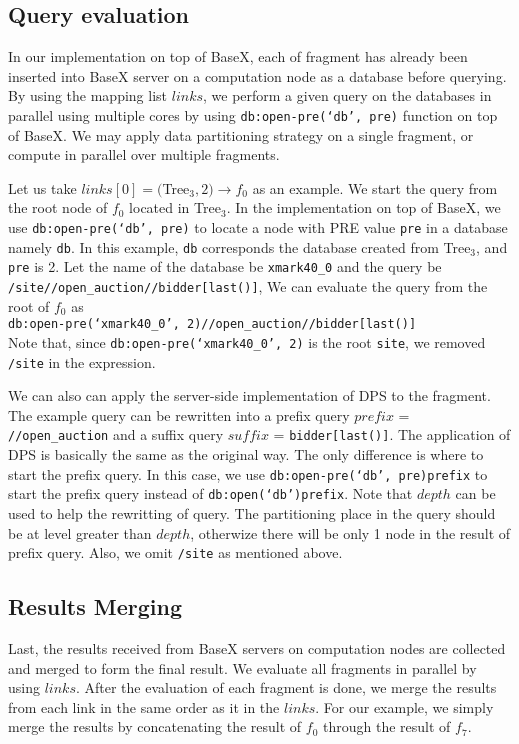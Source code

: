 \subsection{Query evaluation}

In our implementation on top of BaseX, each of fragment has already been
inserted into BaseX server on a computation node as a database before querying.
By using the mapping list $links$, we perform a given query on the databases in
parallel using multiple cores by using \texttt{db:open-pre(`db', pre)} function
on top of BaseX. We may apply data partitioning strategy on a single fragment,
or compute in parallel over multiple fragments.

Let us take $links[0] = ($Tree$_3, 2) \rightarrow f_0$ as an example. We start
the query from the root node of $f_0$ located in Tree$_3$. In the implementation
on top of BaseX, we use \texttt{db:open-pre(`db', pre)} to locate a node with
PRE value \texttt{pre} in a database namely \texttt{db}. In this example,
\texttt{db} corresponds the database created from Tree$_3$, and \texttt{pre} is
2. Let the name of the database be \texttt{xmark40\_0} and the query be
\texttt{/site//open\_auction//bidder[last()]}, We can evaluate the query from
the root of $f_0$ as \\ \texttt{db:open-pre(`xmark40\_0',
	2)//open\_auction//bidder[last()]}\\ Note that, since
\texttt{db:open-pre(`xmark40\_0', 2)} is the root \texttt{site}, we removed
\texttt{/site} in the expression.

We can also can apply the server-side implementation of DPS to the fragment. The
example query can be rewritten into a prefix query $prefix$ =
\texttt{//open\_auction} and a suffix query $suffix$ = \texttt{bidder[last()]}.
The application of DPS is basically the same as the original way. The only
difference is where to start the prefix query. In this case, we use
\texttt{db:open-pre(`db', pre)prefix} to start the prefix query instead of
\texttt{db:open(`db')prefix}. Note that $depth$ can be used to help the
rewritting of query. The partitioning place in the query should be at level
greater than $depth$, otherwize there will be only 1 node in the result of
prefix query. Also, we omit \texttt{/site} as mentioned above.


\subsection{Results Merging}

Last, the results received from BaseX servers on computation nodes are collected
and merged to form the final result. We evaluate all fragments in parallel by
using $links$. After the evaluation of each fragment is done, we merge the
results from each link in the same order as it in the $links$. For our example,
we simply merge the results by concatenating the result of $f_0$ through the
result of $f_7$.


